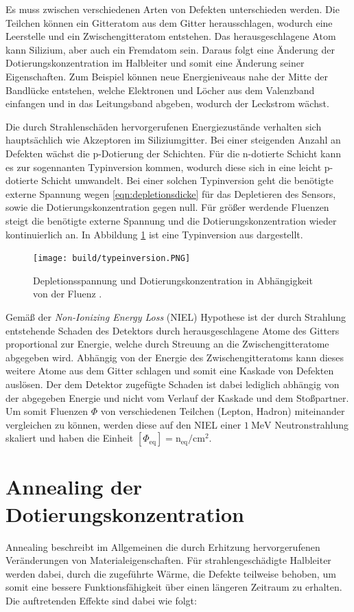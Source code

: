 Es muss zwischen verschiedenen Arten von Defekten unterschieden werden. Die Teilchen können ein Gitteratom aus dem
Gitter herausschlagen, wodurch eine Leerstelle und ein Zwischengitteratom entstehen. Das herausgeschlagene Atom
kann Silizium, aber auch ein Fremdatom sein. Daraus folgt eine Änderung der Dotierungskonzentration im
Halbleiter und somit eine Änderung seiner Eigenschaften. Zum Beispiel können neue Energieniveaus nahe der Mitte der
Bandlücke entstehen, welche Elektronen und Löcher aus dem Valenzband einfangen  und in das Leitungsband
abgeben, wodurch der Leckstrom wächst.


Die durch Strahlenschäden hervorgerufenen Energiezustände verhalten sich hauptsächlich wie Akzeptoren im Siliziumgitter. Bei
einer steigenden Anzahl an Defekten wächst die p-Dotierung der Schichten. Für die n-dotierte Schicht kann
es zur sogennanten Typinversion kommen, wodurch diese sich in eine leicht p-dotierte Schicht umwandelt. Bei einer
solchen Typinversion
geht die benötigte externe Spannung wegen \ref{eqn:depletionsdicke} für das Depletieren des Sensors,
sowie die Dotierungskonzentration gegen null.
Für größer werdende Fluenzen steigt die benötigte externe Spannung und die
Dotierungskonzentration wieder kontinuierlich an.
In Abbildung \ref{fig:typeinversion} ist eine Typinversion aus \cite{typinversion} dargestellt.

\begin{figure}
  \centering
    \texttt{[image: build/typeinversion.PNG]}
\caption{Depletionsspannung und Dotierungskonzentration in Abhängigkeit von der Fluenz \cite{typinversion}.}
\label{fig:typeinversion}
\end{figure}

Gemäß der \textit{Non-Ionizing Energy Loss} (NIEL) Hypothese ist der durch Strahlung entstehende Schaden des Detektors durch
herausgeschlagene Atome des Gitters proportional zur Energie, welche durch Streuung an die Zwischengitteratome abgegeben wird.
Abhängig von der Energie des Zwischengitteratoms kann dieses weitere Atome aus dem Gitter schlagen und somit
eine Kaskade von Defekten auslösen. Der dem Detektor zugefügte Schaden ist dabei
lediglich abhängig von der abgegeben Energie und nicht vom Verlauf der Kaskade und dem Stoßpartner.
Um somit Fluenzen $ \Phi$ von verschiedenen Teilchen (Lepton, Hadron) miteinander vergleichen zu können, werden diese
auf den NIEL einer $\SI{1}{\mega\eV}$ Neutronstrahlung skaliert und haben die Einheit $[\Phi_{\mathrm{eq}}]=\mathrm{n_{\mathrm{eq}}/cm^2}$.


\section{Annealing der Dotierungskonzentration}
Annealing beschreibt im Allgemeinen die durch Erhitzung hervorgerufenen Veränderungen von Materialeigenschaften. Für strahlengeschädigte
Halbleiter werden dabei, durch die zugeführte Wärme, die Defekte teilweise behoben, um somit eine
bessere Funktionsfähigkeit über einen längeren Zeitraum zu erhalten. Die auftretenden Effekte sind dabei wie folgt:

